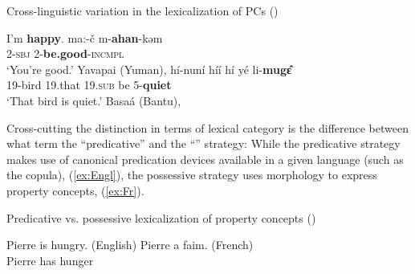 \documentclass[output=paper,colorlinks,citecolor=brown]{langscibook}
\begin{document}
\begin{exe}
    \ex  Cross-linguistic variation in the lexicalization of PCs (\citealt[1]{HaninkKoontz})
   \begin{xlist}
       \ex \label{ex:PCadj} I'm \textbf{happy}.
       \ex \label{ex:PCvb} \gll  ma:-č m-\textbf{ahan}-kəm\\
       \textsc{2-sbj} \textsc{2}-\textbf{be.good}-\textsc{incmpl}\\
       \glt `You're good.' \hfill Yavapai (Yuman), \citealt[90]{Kendall1975}
       \ex \label{ex:PCnoun} \gll hí-nuní híí hí yé li-\textbf{mugɛ̂}\\
\textsc{19}-bird \textsc{19}.that \textsc{19.sub} be
 \textsc{5}-\textbf{quiet}\\
 \glt `That bird is quiet.' \hfill Basaá (Bantu), \citealt[650]{Jenks2018}
   \end{xlist} 
\end{exe}



Cross-cutting the distinction in terms of lexical category is the difference between what \citet{FrancezKoontz2015, FrancezKoontz2017} term the ``predicative'' and the ``'' strategy: While the predicative strategy makes use of canonical predication devices available in a given language (such as the copula), (\ref{ex:Engl}), the possessive strategy uses  morphology to express property concepts, (\ref{ex:Fr}). 

\begin{exe}
\ex Predicative vs. possessive lexicalization of property concepts (\citealt[22]{FrancezKoontz2017})
\begin{xlist}
    \ex         Pierre is hungry.	\hfill (English) \label{ex:Engl}
    \ex     	Pierre 	a 	faim.	\hfill  (French) \label{ex:Fr}	\\
Pierre 	has 	hunger \\
\end{xlist}
\end{exe}
\end{document}
